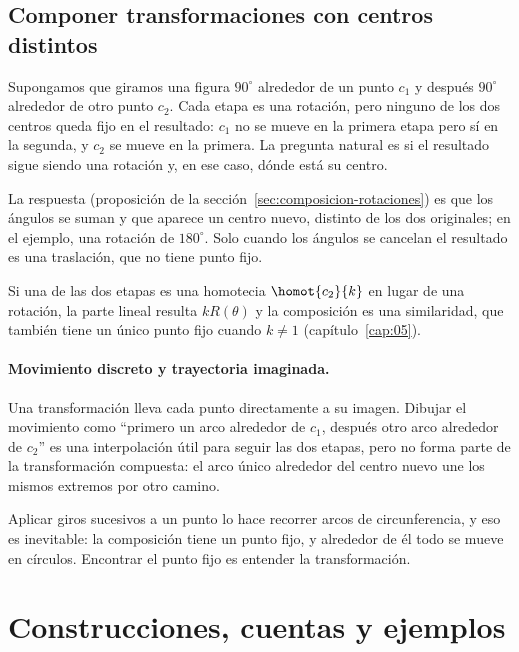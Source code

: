 \subsection{Componer transformaciones con centros distintos}\label{sec:componer-centros}

Supongamos que giramos una figura \(90^\circ\) alrededor de un punto \(c_1\) y después
\(90^\circ\) alrededor de otro punto \(c_2\). Cada etapa es una rotación, pero ninguno de los
dos centros queda fijo en el resultado: \(c_1\) no se mueve en la primera etapa pero sí en la
segunda, y \(c_2\) se mueve en la primera. La pregunta natural es si el resultado sigue siendo
una rotación y, en ese caso, dónde está su centro.

La respuesta (proposición de la sección~\ref{sec:composicion-rotaciones}) es que los ángulos
se suman y que aparece un centro nuevo, distinto de los dos originales; en el ejemplo, una
rotación de \(180^\circ\). Solo cuando los ángulos se cancelan el resultado es una traslación,
que no tiene punto fijo.

Si una de las dos etapas es una homotecia \(\homot{c_2}{k}\) en lugar de una rotación, la parte
lineal resulta \(kR(\theta)\) y la composición es una similaridad, que también tiene un único
punto fijo cuando \(k\neq1\) (capítulo~\ref{cap:05}).

\paragraph{Movimiento discreto y trayectoria imaginada.}
Una transformación lleva cada punto directamente a su imagen. Dibujar el movimiento como
``primero un arco alrededor de \(c_1\), después otro arco alrededor de \(c_2\)'' es una
interpolación útil para seguir las dos etapas, pero no forma parte de la transformación
compuesta: el arco único alrededor del centro nuevo une los mismos extremos por otro camino.

\begin{idea}[Idea]
Aplicar giros sucesivos a un punto lo hace recorrer arcos de circunferencia, y eso es
inevitable: la composición tiene un punto fijo, y alrededor de él todo se mueve en
círculos. Encontrar el punto fijo es entender la transformación.
\end{idea}

\section{Construcciones, cuentas y ejemplos}

